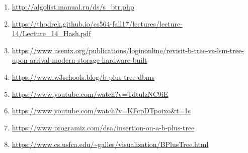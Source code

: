 \documentclass{article}
\begin{document}
\begin{enumerate}
\item \url{http://algolist.manual.ru/ds/s_btr.php}
\item \url{https://thodrek.github.io/cs564-fall17/lectures/lecture-14/Lecture_14_Hash.pdf}
\item \url{https://www.usenix.org/publications/loginonline/revisit-b-tree-vs-lsm-tree-upon-arrival-modern-storage-hardware-built}
\item \url{https://www.w3schools.blog/b-plus-tree-dbms}
\item \url{https://www.youtube.com/watch?v=TdtulzNC9iE}
\item \url{https://www.youtube.com/watch?v=KFcpDTpoixo&t=1s}
\item \url{https://www.programiz.com/dsa/insertion-on-a-b-plus-tree}
\item \url{https://www.cs.usfca.edu/~galles/visualization/BPlusTree.html}

\end{enumerate}
\end{document}
